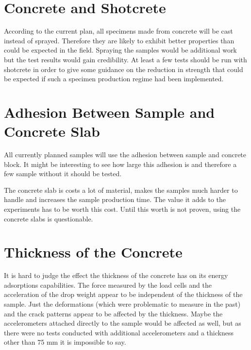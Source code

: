 \section{Concrete and Shotcrete}

According to the current plan, all specimens made from concrete will be cast instead of sprayed. Therefore they are likely to exhibit better properties than could be expected in the field. Spraying the samples would be additional work but the test results would gain credibility. At least  a few tests should be run with shotcrete in order to give some guidance on the reduction in strength that could be expected if such a specimen production regime had been implemented.

\section{Adhesion Between Sample and Concrete Slab}

All currently planned samples will use the adhesion between sample and concrete block. It might be interesting to see how large this adhesion is and therefore a few sample without it should be tested.

The concrete slab is costs a lot of material, makes the samples much harder to handle and increases the sample production time. The value it adds to the experiments has to be worth this cost. Until this worth is not proven, using the concrete slabs is questionable.

\section{Thickness of the Concrete}

It is hard to judge the effect the thickness of the concrete has on its energy adsorptions capabilities. The force measured by the load cells and the acceleration of the drop weight appear to be independent of the thickness of the sample. Just the deformations (which were problematic to measure in the past) and the crack patterns appear to be affected by the thickness. Maybe the accelerometers attached directly to the sample would be affected as well, but as there were no tests conducted with additional accelerometers and a thickness other than 75 mm it is impossible to say.


